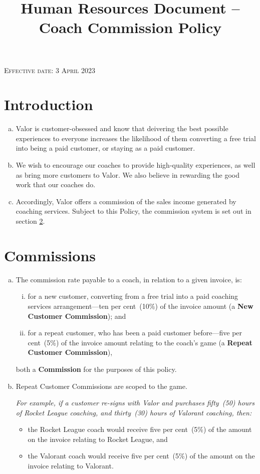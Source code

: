 \documentclass[10pt]{article}
\begin{document}
\title{Human Resources Document -- Coach Commission Policy}

\textsc{Effective date: 3 April 2023}

\section{Introduction}
\begin{enumerate}[(a)]
	\item Valor is customer-obsessed and know that deivering the best possible experiences to everyone increases the likelihood of them converting a free trial into being a paid customer, or staying as a paid customer.

	\item We wish to encourage our coaches to provide high-quality experiences, as well as bring more customers to Valor. We also believe in rewarding the good work that our coaches do.

	\item Accordingly, Valor offers a commission of the sales income generated by coaching services. Subject to this Policy, the commission system is set out in section \ref{sec_commissions}.
\end{enumerate}


\section{Commissions}
\label{sec_commissions}
\begin{enumerate}[(a)]
	\item The commission rate payable to a coach, in relation to a given invoice, is:
	\begin{enumerate}[(i)]
		\item for a new customer, converting from a free trial into a paid coaching services arrangement---ten per cent~(10\%) of the invoice amount (a \textbf{New Customer Commission}); and

		\item for a repeat customer, who has been a paid customer before---five per cent~(5\%) of the invoice amount relating to the coach's game (a \textbf{Repeat Customer Commission}),
	\end{enumerate}
		both a \textbf{Commission} for the purposes of this policy.

	\item Repeat Customer Commissions are scoped to the game.

	\itshape
	For example, if a customer re-signs with Valor and purchases fifty~(50) hours of Rocket League coaching, and thirty~(30) hours of Valorant coaching, then:
	\begin{itemize}
		\item the Rocket League coach would receive five per cent~(5\%) of the amount on the invoice relating to Rocket League, and

		\item the Valorant coach would receive five per cent~(5\%) of the amount on the invoice relating to Valorant.
	\end{itemize}
	\normalshape
\end{enumerate}
\end{document}
